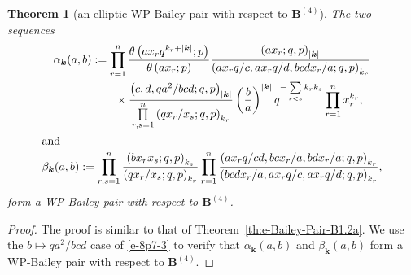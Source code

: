 \documentclass[pdftex]{sigma}
\numberwithin{equation}{section}
\newtheorem{Theorem}{Theorem}[section]
\newcommand\sumk{{\left| \boldsymbol{k} \right|}}
\newcommand{\B}{{ \mathbf B}}
\renewcommand{\k}{{ \boldsymbol{k}}}
\newcommand{\sqprod}[1]{\prod\limits_{r, s =1}^{#1}} %
\newcommand{\smallprod}[1]{\prod\limits_{r =1}^{#1}} %
\newcommand{\xover}[1]{#1_{r}/#1_{s}}
\newcommand{\ellipticqrfac}[2]{{\left({#1}; q, p\right)_{#2}}} %
\newcommand{\elliptictheta}[1]{\theta \left({#1} ; p\right) }
\begin{document}
\begin{Theorem}[an elliptic WP Bailey pair with respect to $\B^{(4)}$]\label{th:e-Bailey-Pair-B4.2} The two sequences
\begin{subequations}
\begin{gather}
\alpha_\k(a,b) := \smallprod n \frac{\elliptictheta{ax_rq^{k_r+\sumk}}}{\elliptictheta{ax_r}}
\frac{\ellipticqrfac{ax_r}{\sumk}} {\ellipticqrfac{ax_rq/c,ax_rq/d, bcdx_r/a }{k_r} } \notag\\
\hphantom{\alpha_\k(a,b) :=}{} \times
\frac{\ellipticqrfac{c, d, qa^2/bcd}{\sumk} }
{\sqprod n \ellipticqrfac{q\xover x}{k_r}}
 \left( \frac{b}{a}\right)^{\sumk}
q^{-\sum\limits_{r<s} k_rk_s} \smallprod n x_r^{k_r} , \label{e-Bailey-PairB4.2a} \\
 \intertext{and}
\beta_\k(a,b) := \sqprod n\frac{\ellipticqrfac{bx_rx_s}{k_s}}{\ellipticqrfac{q\xover x}{k_r}}
\smallprod n \frac{\ellipticqrfac{ax_rq/cd, bcx_r/a, bdx_r/a}{k_r}}
{\ellipticqrfac{bcdx_r/a, ax_rq/c, ax_rq/d}{k_r}},\label{e-Bailey-PairB4.2}
\end{gather}
\end{subequations}
form a WP-Bailey pair with respect to $\B^{(4)}$.
\end{Theorem}
\begin{proof}The proof is similar to that of Theorem~\ref{th:e-Bailey-Pair-B1.2a}. We use the $b\mapsto qa^2/bcd$ case of \eqref{e-8p7-3} to verify that $\alpha_\k(a,b)$ and $\beta_\k(a,b)$ form a WP-Bailey pair with respect to $\B^{(4)}$.
\end{proof}
\end{document}

